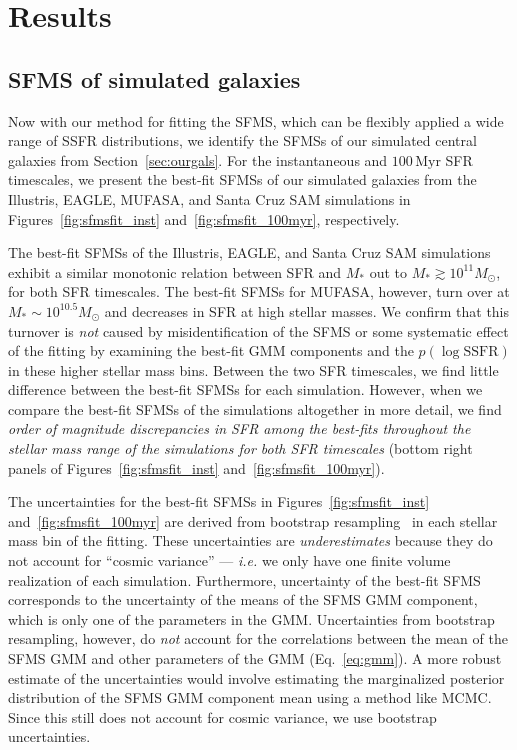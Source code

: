 \documentclass[preprint2,tighten]{aastex62}
\begin{document}
\section{Results} \label{sec:results}
\subsection{SFMS of simulated galaxies}
Now with our method for fitting the SFMS, which can be flexibly 
applied a wide range of SSFR distributions, we identify the SFMSs of our simulated
central galaxies from Section~\ref{sec:ourgals}. For the instantaneous and 
$100\,\mathrm{Myr}$ SFR timescales, we present the best-fit SFMSs of our 
simulated galaxies from the Illustris, EAGLE, MUFASA, and Santa Cruz SAM 
simulations in Figures~\ref{fig:sfmsfit_inst} and~\ref{fig:sfmsfit_100myr}, 
respectively. %

The best-fit SFMSs of the Illustris, EAGLE, and Santa Cruz SAM simulations
exhibit a similar monotonic relation between SFR and $M_*$ out to 
$M_* \gtrsim 10^{11}M_\odot$, for both SFR timescales. The best-fit SFMSs 
for MUFASA, however, turn over at 
$M_*{\sim}10^{10.5} M_\odot$ and decreases in SFR at high stellar masses. 
We confirm that this turnover is \emph{not} caused by misidentification of 
the SFMS or some systematic effect of the fitting by examining the 
best-fit GMM components  and the $p(\log\mathrm{SSFR})$ in these higher 
stellar mass bins. Between the two SFR timescales, we find little difference 
between the best-fit SFMSs for each simulation. However, when we compare the 
best-fit SFMSs of the simulations altogether in more detail, we find 
\emph{order of magnitude discrepancies in SFR among the best-fits throughout 
the stellar mass range of the simulations for both SFR timescales} (bottom 
right panels of Figures~\ref{fig:sfmsfit_inst} and~\ref{fig:sfmsfit_100myr}). 

The uncertainties for the best-fit SFMSs in Figures~\ref{fig:sfmsfit_inst} 
and~\ref{fig:sfmsfit_100myr} are derived from bootstrap resampling~\citep{efron1979} 
in each stellar mass bin of the fitting. These uncertainties are \emph{underestimates} because 
they do not account for ``cosmic variance'' --- \emph{i.e.} we only have one 
finite volume realization of each simulation. Furthermore, uncertainty of the best-fit 
SFMS corresponds to the uncertainty of the means of the SFMS GMM component, 
which is only one of the parameters in the GMM. Uncertainties from bootstrap 
resampling, however, do \emph{not} account for the correlations between the 
mean of the SFMS GMM and other
parameters of the GMM (Eq.~\ref{eq:gmm}). A more robust estimate of the 
uncertainties would involve estimating the marginalized posterior distribution 
of the SFMS GMM component mean using a method like MCMC. Since this still 
does not account for cosmic variance, we use bootstrap uncertainties. 
\end{document}

